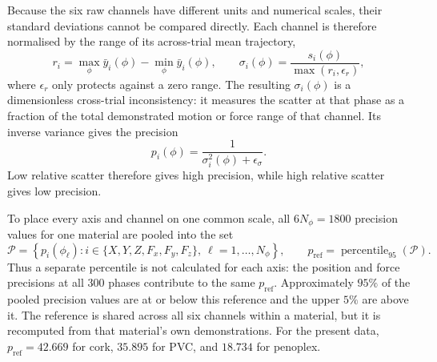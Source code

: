 \documentclass[11pt,a4paper]{article}
\begin{document}
Because the six raw channels have different units and numerical scales, their
standard deviations cannot be compared directly. Each channel is therefore
normalised by the range of its across-trial mean trajectory,
\begin{equation}
r_i=\max_{\phi}\bar y_i(\phi)-\min_{\phi}\bar y_i(\phi),
\qquad
\sigma_i(\phi)=\frac{s_i(\phi)}{\max(r_i,\epsilon_r)} ,
\label{eq:gain_range_normalisation}
\end{equation}
where $\epsilon_r$ only protects against a zero range. The resulting
$\sigma_i(\phi)$ is a dimensionless cross-trial inconsistency: it measures
the scatter at that phase as a fraction of the total demonstrated motion or
force range of that channel. Its inverse variance gives the precision
\begin{equation}
p_i(\phi)=\frac{1}{\sigma_i^2(\phi)+\epsilon_\sigma}.
\label{eq:gain_precision_raw}
\end{equation}
Low relative scatter therefore gives high precision, while high relative
scatter gives low precision.

To place every axis and channel on one common scale, all $6N_\phi=1800$
precision values for one material are pooled into the set
\begin{equation}
\mathcal P
=\left\{p_i(\phi_\ell):
i\in\{X,Y,Z,F_x,F_y,F_z\},\
\ell=1,\ldots,N_\phi\right\},
\qquad
p_{\mathrm{ref}}=\operatorname{percentile}_{95}(\mathcal P).
\label{eq:gain_shared_pref}
\end{equation}
Thus a separate percentile is not calculated for each axis: the position and
force precisions at all 300 phases contribute to the same $p_{\mathrm{ref}}$.
Approximately $95\%$ of the pooled precision values are at or below this
reference and the upper $5\%$ are above it. The reference is shared across
all six channels within a material, but it is recomputed from that material's
own demonstrations. For the present data, $p_{\mathrm{ref}}=42.669$ for cork,
$35.895$ for PVC, and $18.734$ for penoplex.
\end{document}
